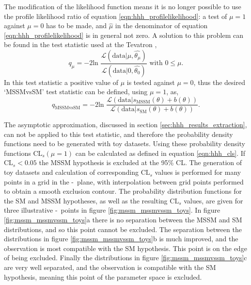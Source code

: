 The modification of the likelihood function means it is no longer possible
to use the profile likelihood ratio of equation \ref{eqn:hhh_profilelikelihood}:
a test of $\mu=1$ against $\mu=0$ has to be made, and 
$\hat{\mu}$ in the denominator of equation \ref{eqn:hhh_profilelikelihood} is in 
general not zero. A solution to this problem can be found in the test statistic used at the Tevatron \cite{LHCHComb2011},
\begin{equation}\label{eqn:mssm_tevatron_teststat}
q_{\mu} = -2\text{ln }\frac{\mathcal{L}(\text{data}|\mu,\hat{\theta_{\mu}})}{\mathcal{L}(\text{data}|0,\hat{\theta_0})} \text{ with } 0\leq\mu.
\end{equation}
In this test statistic a positive value of $\mu$ is tested against $\mu=0$, thus 
the desired `MSSMvsSM' test statistic can be defined, using $\mu=1$, as,
\begin{equation}\label{eqn:mssm_mssmvssm_stat}
q_{\text{MSSMvsSM}} = -2\text{ln }\frac{\mathcal{L}(\text{data}|s_{\text{MSSM}}(\theta) + b(\theta))}{\mathcal{L}(\text{data}|s_{\text{SM}}(\theta)+b(\theta))}.
\end{equation}

The asymptotic approximation, discussed in section \ref{sec:hhh_results_extraction}, can not be applied
to this test statistic, and therefore the probability density functions need to be generated 
with toy datasets. Using these probability density functions $\text{CL}_s(\mu=1)$ can be calculated as defined in equation \ref{eqn:hhh_cls}.
If $\text{CL}_s < 0.05$ the \ac{MSSM} hypothesis is excluded at the 95\% CL. The generation of toy datasets and 
calculation of corresponding $\text{CL}_s$ values is performed for many points in a grid in the \mA-\tanb~plane,
with interpolation between grid points performed to obtain a smooth exclusion contour.
The probability distribution functions for the \ac{SM} and \ac{MSSM} hypotheses, as well as the resulting $\text{CL}_s$ values,
are given for three illustrative \mA-\tanb~points in figure \ref{fig:mssm_mssmvssm_toys}. In figure \ref{fig:mssm_mssmvssm_toys}a
there is no separation between the \ac{MSSM} and \ac{SM} distributions, and so this point cannot be excluded. The separation
between the distributions in figure \ref{fig:mssm_mssmvssm_toys}b is much improved, and the observation is most compatible
with the \ac{SM} hypothesis. This point is on the edge of being excluded. Finally the distributions in figure \ref{fig:mssm_mssmvssm_toys}c
are very well separated, and the observation is compatible with the \ac{SM} hypothesis, meaning this point of the parameter space is excluded.

